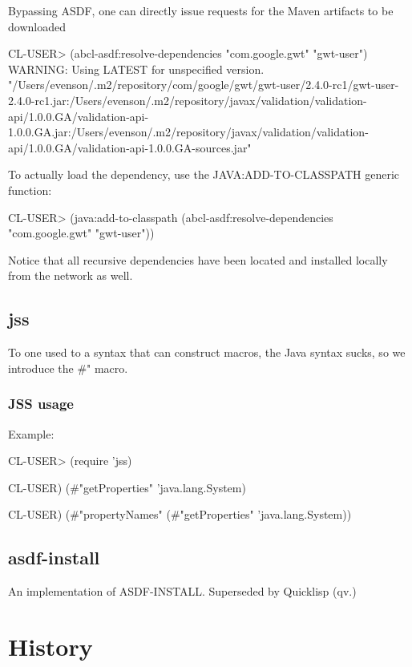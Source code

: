 \documentclass[10pt]{book}
\begin{document}
Bypassing ASDF, one can directly issue requests for the Maven
artifacts to be downloaded

\begin{listing-lisp}
    CL-USER> (abcl-asdf:resolve-dependencies "com.google.gwt" "gwt-user")
    WARNING: Using LATEST for unspecified version.
    "/Users/evenson/.m2/repository/com/google/gwt/gwt-user/2.4.0-rc1/gwt-user-2.4.0-rc1.jar:/Users/evenson/.m2/repository/javax/validation/validation-api/1.0.0.GA/validation-api-1.0.0.GA.jar:/Users/evenson/.m2/repository/javax/validation/validation-api/1.0.0.GA/validation-api-1.0.0.GA-sources.jar"
\end{listing-lisp}

To actually load the dependency, use the JAVA:ADD-TO-CLASSPATH generic
function:

\begin{listing-lisp}
    CL-USER> (java:add-to-classpath (abcl-asdf:resolve-dependencies "com.google.gwt" "gwt-user"))
\end{listing-lisp}

Notice that all recursive dependencies have been located and installed
locally from the network as well.

\section{jss}

To one used to a syntax that can construct macros, the Java syntax
sucks, so we introduce the \#" macro.

\subsection{JSS usage}

Example:

\begin{listing-lisp}
  CL-USER> (require 'jss)

  CL-USER) (#"getProperties" 'java.lang.System)

  CL-USER) (#"propertyNames" (#"getProperties" 'java.lang.System))
\end{listing-lisp}

\section{asdf-install}

An implementation of ASDF-INSTALL.  Superseded by Quicklisp (qv.)

\chapter{History}
\end{document}
